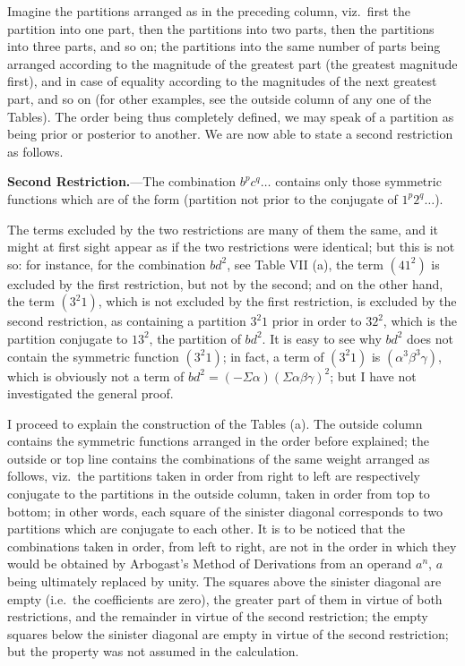 \documentclass[11pt]{article}
\begin{document}
Imagine the partitions arranged as in the preceding column, viz.\ first the partition into one part, then the partitions into two parts, then the partitions into three parts, and so on; the partitions into the same number of parts being arranged according to the magnitude of the greatest part (the greatest magnitude first), and in case of equality according to the magnitudes of the next greatest part, and so on (for other examples, see the outside column of any one of the Tables). The order being thus completely defined, we may speak of a partition as being prior or posterior to another. We are now able to state a second restriction as follows.

\medskip

\noindent\textbf{Second Restriction.}---The combination $b^p c^q\ldots$ contains only those symmetric functions which are of the form (partition not prior to the conjugate of $1^p 2^q\ldots$).

\medskip

The terms excluded by the two restrictions are many of them the same, and it might at first sight appear as if the two restrictions were identical; but this is not so: for instance, for the combination $bd^2$, see Table VII (a), the term $(41^2)$ is excluded by the first restriction, but not by the second; and on the other hand, the term $(3^2 1)$, which is not excluded by the first restriction, is excluded by the second restriction, as containing a partition $3^2 1$ prior in order to $32^2$, which is the partition conjugate to $13^2$, the partition of $bd^2$. It is easy to see why $bd^2$ does not contain the symmetric function $(3^2 1)$; in fact, a term of $(3^2 1)$ is $(\alpha^3 \beta^3 \gamma)$, which is obviously not a term of $bd^2 = (-\Sigma\alpha)(\Sigma\alpha\beta\gamma)^2$; but I have not investigated the general proof.

I proceed to explain the construction of the Tables (a). The outside column contains the symmetric functions arranged in the order before explained; the outside or top line contains the combinations of the same weight arranged as follows, viz.\ the partitions taken in order from right to left are respectively conjugate to the partitions in the outside column, taken in order from top to bottom; in other words, each square of the sinister diagonal corresponds to two partitions which are conjugate to each other. It is to be noticed that the combinations taken in order, from left to right, are not in the order in which they would be obtained by Arbogast's Method of Derivations from an operand $a^n$, $a$ being ultimately replaced by unity. The squares above the sinister diagonal are empty (i.e.\ the coefficients are zero), the greater part of them in virtue of both restrictions, and the remainder in virtue of the second restriction; the empty squares below the sinister diagonal are empty in virtue of the second restriction; but the property was not assumed in the calculation.
\end{document}
